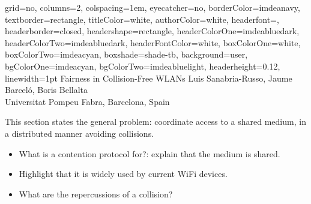 \documentclass[portrait,a0paper]{baposter}
\begin{document}
\begin{poster}
{
	grid=no,
	columns=2,
	colspacing=1em,
	eyecatcher=no,
	borderColor=imdeanavy,
	textborder=rectangle,
  	titleColor=white,
    	authorColor=white,
	headerfont=\textsf,
	headerborder=closed,
	headershape=rectangle,
	headerColorOne=imdeabluedark,
	headerColorTwo=imdeabluedark,
	headerFontColor=white,
	boxColorOne=white,
	boxColorTwo=imdeacyan,
	boxshade=shade-tb,
	background=user,
	bgColorOne=imdeacyan,
	bgColorTwo=imdeabluelight,
	headerheight=0.12\textheight,
	linewidth=1pt
}
{
}
{Fairness in Collision-Free WLANs}
{
	Luis Sanabria-Russo, Jaume Barcel{\'o}, Boris Bellalta\vspace{0.5em}\\
	\normalsize Universitat Pompeu Fabra, Barcelona, Spain
}

{

This section states the general problem: coordinate access to a shared medium, in a distributed manner avoiding collisions.
\begin{itemize}
 \item What is a contention protocol for?: explain that the medium is shared.
 \item Highlight that it is widely used by current WiFi devices.
 \item What are the repercussions of a collision?
\end{itemize}

}



\end{poster}
\end{document}
